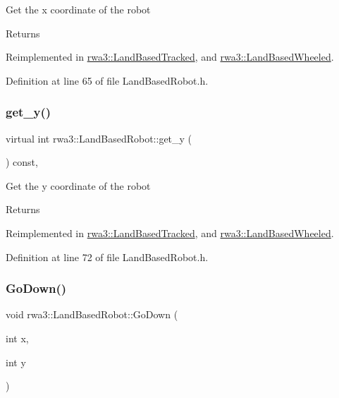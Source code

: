 Get the x coordinate of the robot \begin{DoxyReturn}{Returns}

\end{DoxyReturn}


Reimplemented in \hyperlink{classrwa3_1_1_land_based_tracked_a9065f381181bef7d8a4c8f4061ef2cda}{rwa3\+::\+Land\+Based\+Tracked}, and \hyperlink{classrwa3_1_1_land_based_wheeled_a71d85c53a65516d08728284e27107f65}{rwa3\+::\+Land\+Based\+Wheeled}.



Definition at line 65 of file Land\+Based\+Robot.\+h.

\mbox{\label{classrwa3_1_1_land_based_robot_a6de17dafe355573275264f74a59f974d}} 
\subsubsection{\texorpdfstring{get\+\_\+y()}{get\_y()}}
{\footnotesize\ttfamily virtual int rwa3\+::\+Land\+Based\+Robot\+::get\+\_\+y (\begin{DoxyParamCaption}{ }\end{DoxyParamCaption}) const\hspace{0.3cm}{\ttfamily [inline]}, {\ttfamily [virtual]}}

Get the y coordinate of the robot \begin{DoxyReturn}{Returns}

\end{DoxyReturn}


Reimplemented in \hyperlink{classrwa3_1_1_land_based_tracked_a11025bced4da296a2207e169fe328857}{rwa3\+::\+Land\+Based\+Tracked}, and \hyperlink{classrwa3_1_1_land_based_wheeled_ac16ccd003eae45997e00b4eee71bae3f}{rwa3\+::\+Land\+Based\+Wheeled}.



Definition at line 72 of file Land\+Based\+Robot.\+h.

\mbox{\label{classrwa3_1_1_land_based_robot_a14fcb1b05297131cd09e8a57b8de0578}} 
\subsubsection{\texorpdfstring{Go\+Down()}{GoDown()}}
{\footnotesize\ttfamily void rwa3\+::\+Land\+Based\+Robot\+::\+Go\+Down (\begin{DoxyParamCaption}\item[{int}]{x,  }\item[{int}]{y }\end{DoxyParamCaption})\hspace{0.3cm}{\ttfamily [pure virtual]}}

